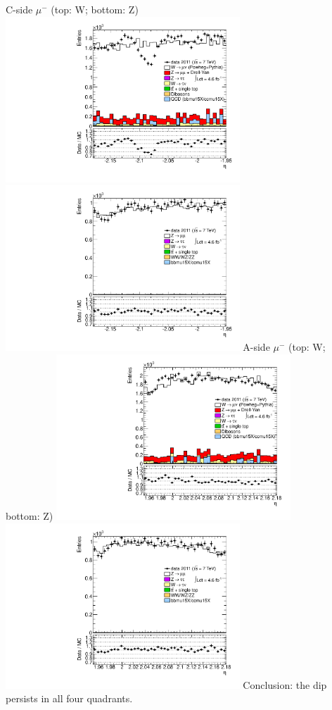  {
\colb[T]
C-side $\mu^{-}$ (top: W; bottom: Z)
\centering
\includegraphics[width=0.66\textwidth]{dates/20130306/figures/etaphi/WlQ4_10_C_stack_l_eta_NEG} \\
\includegraphics[width=0.66\textwidth]{dates/20130306/figures/etaphi/Z_10_C_stack_lN_eta_ALL.pdf}
A-side $\mu^{-}$ (top: W; bottom: Z)
\centering
\includegraphics[width=0.66\textwidth]{dates/20130306/figures/etaphi/WlQ4_10_A_stack_l_eta_NEG} \\
\includegraphics[width=0.66\textwidth]{dates/20130306/figures/etaphi/Z_10_A_stack_lN_eta_ALL.pdf} 
\cole
}
 {
Conclusion: the dip persists in all four quadrants.
}

